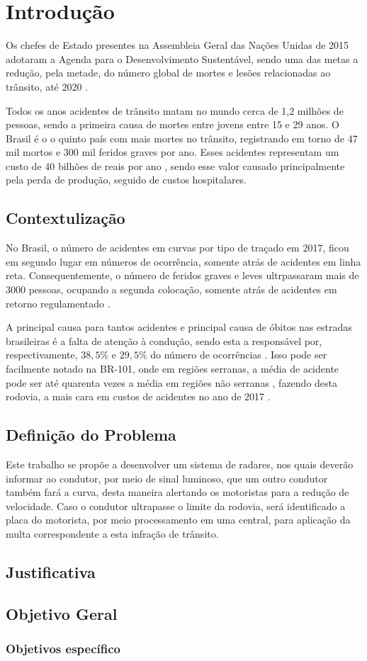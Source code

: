 \chapter{Introdução}

Os chefes de Estado presentes na Assembleia Geral das Nações Unidas de 2015 adotaram a Agenda para o Desenvolvimento Sustentável, sendo uma das metas a redução, pela metade, do número global de mortes e lesões relacionadas ao trânsito, até 2020 \cite{relatorio_oms}.

Todos os anos acidentes de trânsito matam no mundo cerca de 1,2 milhões de pessoas, sendo a primeira causa de mortes entre jovens entre 15 e 29 anos. O Brasil é o o quinto país com mais mortes no trânsito, registrando em torno de 47 mil mortos e 300 mil feridos graves por ano. Esses acidentes representam um custo de 40 bilhões de reais por ano \cite{relatorio_ipea}, sendo esse valor causado principalmente pela perda de produção, seguido de custos hospitalares.

\section{Contextulização}

No Brasil, o número de acidentes em curvas por tipo de traçado em 2017, ficou em segundo lugar em números de ocorrência, somente atrás de acidentes em linha reta. Consequentemente, o número de feridos graves e leves ultrpassaram mais de 3000 pessoas, ocupando a segunda colocação, somente atrás de acidentes em retorno regulamentado \cite{anuario_rodoviario}.

A principal causa para tantos acidentes e principal causa de óbitos nas estradas brasileiras é a falta de atenção à condução, sendo esta a responsável por, respectivamente, $38,5\%$ e $29,5\%$ do número de ocorrências \cite{anuario_rodoviario}. Isso pode ser facilmente notado na BR-101, onde em regiões serranas, a média de acidente pode ser até quarenta vezes a média em regiões não serranas \cite{acidentes}, fazendo desta rodovia, a mais cara em custos de acidentes no ano de 2017 \cite{anuario_rodoviario}.


\section{Definição do Problema}

Este trabalho se propõe a desenvolver um sistema de radares, nos quais deverão informar ao condutor, por meio de sinal luminoso, que um outro condutor também fará a curva, desta maneira alertando os motoristas para a redução de velocidade. Caso o condutor ultrapasse o limite da rodovia, será identificado a placa do motorista, por meio processamento em uma central, para aplicação da multa correspondente a esta infração de trânsito.

\section{Justificativa}
\section{Objetivo Geral}
\subsection{Objetivos específico}